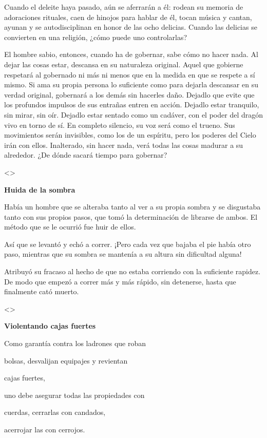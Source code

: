 Cuando el deleite haya pasado, aún se aferrarán a él: rodean su memoria
de adoraciones rituales, caen de hinojos para hablar de él, tocan música
y cantan, ayunan y se autodisciplinan en honor de las ocho delicias.
Cuando las delicias se convierten en una religión, ¿cómo puede uno
controlarlas?

El hombre sabio, entonces, cuando ha de gobernar, sabe cómo no hacer
nada. Al dejar las cosas estar, descansa en su naturaleza original.
Aquel que gobierne respetará al gobernado ni más ni menos que en la
medida en que se respete a sí mismo. Si ama su propia persona lo
suficiente como para dejarla descansar en su verdad original, gobernará
a los demás sin hacerles daño. Dejadlo que evite que los profundos
impulsos de sus entrañas entren en acción. Dejadlo estar tranquilo, sin
mirar, sin oír. Dejadlo estar sentado como un cadáver, con el poder del
dragón vivo en torno de sí. En completo silencio, su voz será como el
trueno. Sus movimientos serán invisibles, como los de un espíritu, pero
los poderes del Cielo irán con ellos. Inalterado, sin hacer nada, verá
todas las cosas madurar a su alrededor. ¿De dónde sacará tiempo para
gobernar?

\textless\textgreater{}

\textbf{{Huida de la sombra}}

Había un hombre que se alteraba tanto al ver a su propia sombra y se
disgustaba tanto con sus propios pasos, que tomó la determinación de
librarse de ambos. El método que se le ocurrió fue huir de ellos.

Así que se levantó y echó a correr. ¡Pero cada vez que bajaba el pie
había otro paso, mientras que su sombra se mantenía a su altura sin
dificultad alguna!

Atribuyó su fracaso al hecho de que no estaba corriendo con la
suficiente rapidez. De modo que empezó a correr más y más rápido, sin
detenerse, hasta que finalmente cató muerto.

\textless\textgreater{}

\textbf{{Violentando cajas fuertes}}

Como garantía contra los ladrones que roban

bolsas, desvalijan equipajes y revientan

cajas fuertes,

uno debe asegurar todas las propiedades con

cuerdas, cerrarlas con candados,

acerrojar las con cerrojos.

